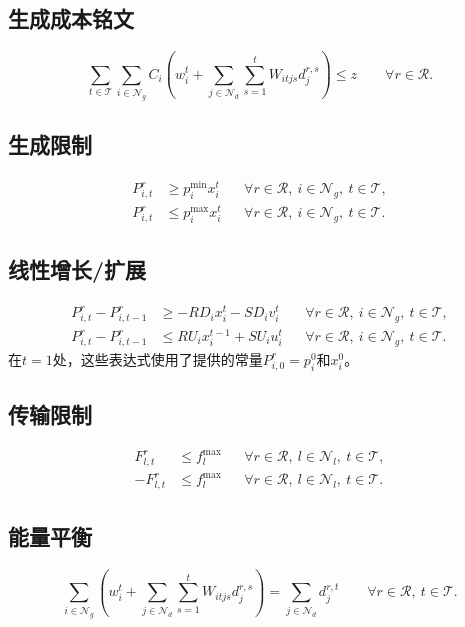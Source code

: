 \documentclass[11pt]{article}
\begin{document}
\subsection{生成成本铭文}

\begin{equation}
 \sum_{t\in\mathcal T}\sum_{i\in\mathcal N_g}
 C_i\left(w_i^t+\sum_{j\in\mathcal N_d}\sum_{s=1}^{t}
 W_{itjs}d_j^{r,s}\right)\le z
 \qquad\forall r\in\mathcal R.
 \label{eq:cost}
\end{equation}

\subsection{生成限制}

\begin{align}
 P_{i,t}^r&\ge p_i^{\min}x_i^t
 &&\forall r\in\mathcal R,\ i\in\mathcal N_g,\ t\in\mathcal T,\label{eq:gen-lower}\\
 P_{i,t}^r&\le p_i^{\max}x_i^t
 &&\forall r\in\mathcal R,\ i\in\mathcal N_g,\ t\in\mathcal T.\label{eq:gen-upper}
\end{align}

\subsection{线性增长/扩展}

\begin{align}
 P_{i,t}^r-P_{i,t-1}^r&\ge -RD_i x_i^t-SD_i v_i^t
 &&\forall r\in\mathcal R,\ i\in\mathcal N_g,\ t\in\mathcal T,\label{eq:ramp-down}\\
 P_{i,t}^r-P_{i,t-1}^r&\le RU_i x_i^{t-1}+SU_i u_i^t
 &&\forall r\in\mathcal R,\ i\in\mathcal N_g,\ t\in\mathcal T.\label{eq:ramp-up}
\end{align}
在$t=1$处，这些表达式使用了提供的常量$P_{i,0}^r=p_i^0$和$x_i^0$。

\subsection{传输限制}

\begin{align}
 F_{l,t}^r&\le f_l^{\max}
 &&\forall r\in\mathcal R,\ l\in\mathcal N_l,\ t\in\mathcal T,\label{eq:flow-upper}\\
 -F_{l,t}^r&\le f_l^{\max}
 &&\forall r\in\mathcal R,\ l\in\mathcal N_l,\ t\in\mathcal T.\label{eq:flow-lower}
\end{align}

\subsection{能量平衡}

\begin{equation}
 \sum_{i\in\mathcal N_g}
 \left(w_i^t+\sum_{j\in\mathcal N_d}\sum_{s=1}^{t}
 W_{itjs}d_j^{r,s}\right)
 =\sum_{j\in\mathcal N_d}d_j^{r,t}
 \qquad\forall r\in\mathcal R,\ t\in\mathcal T.
 \label{eq:balance}
\end{equation}
\end{document}
